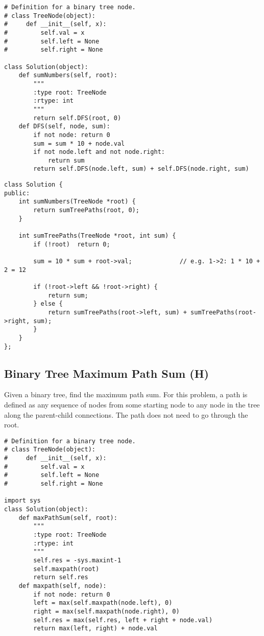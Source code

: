 \begin{lstlisting}
# Definition for a binary tree node.
# class TreeNode(object):
#     def __init__(self, x):
#         self.val = x
#         self.left = None
#         self.right = None

class Solution(object):
    def sumNumbers(self, root):
        """
        :type root: TreeNode
        :rtype: int
        """
        return self.DFS(root, 0)
    def DFS(self, node, sum):
        if not node: return 0
        sum = sum * 10 + node.val
        if not node.left and not node.right:
            return sum
        return self.DFS(node.left, sum) + self.DFS(node.right, sum)                
\end{lstlisting}


\begin{lstlisting}
class Solution {
public:
    int sumNumbers(TreeNode *root) {
        return sumTreePaths(root, 0);
    }
    
    int sumTreePaths(TreeNode *root, int sum) {
        if (!root)  return 0;
        
        sum = 10 * sum + root->val;             // e.g. 1->2: 1 * 10 + 2 = 12
        
        if (!root->left && !root->right) {
            return sum;
        } else {
            return sumTreePaths(root->left, sum) + sumTreePaths(root->right, sum);
        }
    }
};
\end{lstlisting}


\subsection{Binary Tree Maximum Path Sum (H)}
Given a binary tree, find the maximum path sum. For this problem, a path is defined as any sequence of nodes from some starting node to any node in the tree along the parent-child connections. The path does not need to go through the root. \\

\begin{lstlisting}
# Definition for a binary tree node.
# class TreeNode(object):
#     def __init__(self, x):
#         self.val = x
#         self.left = None
#         self.right = None

import sys
class Solution(object):
    def maxPathSum(self, root):
        """
        :type root: TreeNode
        :rtype: int
        """
        self.res = -sys.maxint-1
        self.maxpath(root)
        return self.res
    def maxpath(self, node):
        if not node: return 0
        left = max(self.maxpath(node.left), 0)
        right = max(self.maxpath(node.right), 0)
        self.res = max(self.res, left + right + node.val)
        return max(left, right) + node.val
\end{lstlisting}
        
